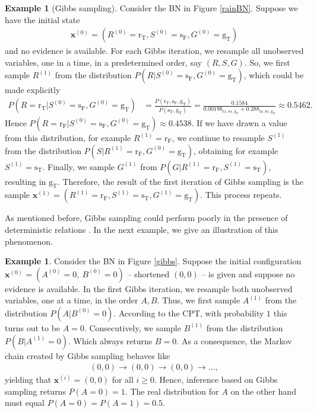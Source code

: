 \documentclass[a4paper, twoside, 11pt]{report}
\theoremstyle{plain}
\theoremstyle{definition}
\newtheorem{example}[thm]{Example}
\theoremstyle{remark}
\newcommand{\gT}{{\text{g}_\text{T} }}
\newcommand{\sT}{{\text{s}_\text{T} }}
\newcommand{\sF}{{\text{s}_\text{F} }}
\newcommand{\rr}{{\text{r} }}
\newcommand{\rT}{{\text{r}_\text{T} }}
\newcommand{\rF}{{\text{r}_\text{F} }}
\newcommand{\bfx}{{\mathbf{x}}}
\begin{document}
\begin{example}[Gibbs sampling]
Consider the BN in Figure \ref{rainBN}. Suppose we have the initial state 
\begin{align*}
\bfx^{(0)} = (R^{(0)} = \rT, S^{(0)} = \sF, G^{(0)} = \gT)
\end{align*}
and no evidence is available. For each Gibbs iteration, we resample all unobserved variables, one in a time, in a predetermined order, say $(R, S, G)$. So, we first sample $R^{(1)}$ from the distribution $P(R | S^{(0)} = \sF, G^{(0)} = \gT)$, which could be made explicitly
\begin{align*}
P(R = \rT | S^{(0)} = \sF, G^{(0)} = \gT) &= \frac{P(\rT, \sF,  \gT)}{P(\sT, \gT)} = \frac{0.1584}{0.00198_{\rT, \sT, \gT} + 0.288_{\rF, \sT, \gT}} \approx 0.5462.
\end{align*}
Hence $P(R = \rF | S^{(0)} = \sF, G^{(0)} = \gT) \approx 0.4538$. If we have drawn a value from this distribution, for example $R^{(1)} = \rF$, we continue to resample $S^{(1)}$ from the distribution $P(S | R^{(1)} = \rF, G^{(0)} = \gT)$, obtaining for example $S^{(1)} = \sT$. Finally, we sample $G^{(1)}$ from $P(G | R^{(1)} = \rF, S^{(1)} = \sT)$, resulting in $\gT$. Therefore, the result of the first iteration of Gibbs sampling is the sample $\bfx^{(1)} = (R^{(1)} = \rF, S^{(1)} = \sT, G^{(1)} = \gT)$. This process repeats.
\end{example}
As mentioned before, Gibbs sampling could perform poorly in the presence of deterministic relations \cite{koller2009probabilistic, poon2006sound, gogate2011samplesearch}. In the next example, we give an illustration of this phenomenon.
\begin{example}\label{ex:gibbs}
Consider the BN in Figure \ref{gibbs}. Suppose the initial configuration $\bfx^{(0)} = (A^{(0)} = 0,\ B^{(0)} = 0)$ -- shortened $(0,0)$ -- is given and suppose no evidence is available. 
In the first Gibbs iteration, we resample both unobserved variables, one at a time, in the order $A, B$. Thus, we first sample $A^{(1)}$ from the distribution $P(A | B^{(0)} = 0)$. According to the CPT, with probability $1$ this turns out to be $A=0$. Consecutively, we sample $B^{(1)}$ from the distribution $P(B | A^{(1)} = 0 )$. Which always returns $B = 0$. As a consequence, the Markov chain created by Gibbs sampling behaves like
\begin{align*}\label{gibbs-trap}
(0,0) \to (0,0) \to (0,0) \to \ldots ,
\end{align*}
yielding that $\bfx^{(i)} = (0,0)$ for all $i \geq 0$. Hence, inference based on Gibbs sampling returns $P(A=0) = 1$. The real distribution for $A$ on the other hand must equal $P(A=0) = P(A=1) = 0.5$.
\end{example}
\end{document}
